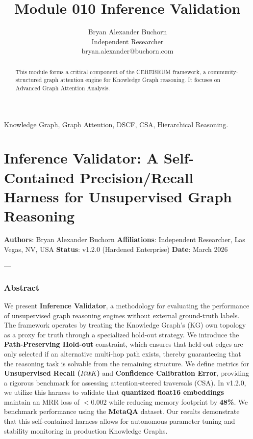 \documentclass[10pt,journal,compsoc]{IEEEtran}
\begin{document}
\title{Module 010 Inference Validation}
\author{Bryan Alexander Buchorn \\ Independent Researcher \\ bryan.alexander@buchorn.com}

\maketitle

\begin{abstract}
This module forms a critical component of the CEREBRUM framework, a community-structured graph attention engine for Knowledge Graph reasoning. It focuses on Advanced Graph Attention Analysis.
\end{abstract}

\begin{IEEEkeywords}
Knowledge Graph, Graph Attention, DSCF, CSA, Hierarchical Reasoning.
\end{IEEEkeywords}

\section{Inference Validator: A Self-Contained Precision/Recall Harness for Unsupe\-rvised Graph Reasoning}

\textbf{Authors}: Bryan Alexander Buchorn  
\textbf{Affili\-ations}: Independent Researcher, Las Vegas, NV, USA  
\textbf{Status}: v1.2.0 (Hardened Enterprise)  
\textbf{Date}: March 2026

---

\subsubsection{Abstract}
We present \textbf{Inference Validator}, a methodology for evaluating the performance of unsup\-ervised graph reasoning engines without external ground-truth labels. The framework operates by treating the Knowledge Graph's (KG) own topology as a proxy for truth through a specialized hold-out strategy. We introduce the \textbf{Path-Preserving Hold-out} constraint, which ensures that held-out edges are only selected if an alternative multi-hop path exists, thereby guara\-nteeing that the reasoning task is solvable from the remaining structure. We define metrics for \textbf{Unsupe\-rvised Recall ($R@K$)} and \textbf{Confidence Calibration Error}, providing a rigorous benchmark for assessing attention-steered traversals (CSA). In v1.2.0, we utilize this harness to validate that \textbf{quantized float16 embeddings} maintain an MRR loss of $< 0.002$ while reducing memory footprint by \textbf{48\%}. We benchmark performance using the \textbf{MetaQA} \cite{metaqa2017} dataset. Our results demonstrate that this self-contained harness allows for autonomous parameter tuning and stability monitoring in production Knowledge Graphs.
\end{document}
